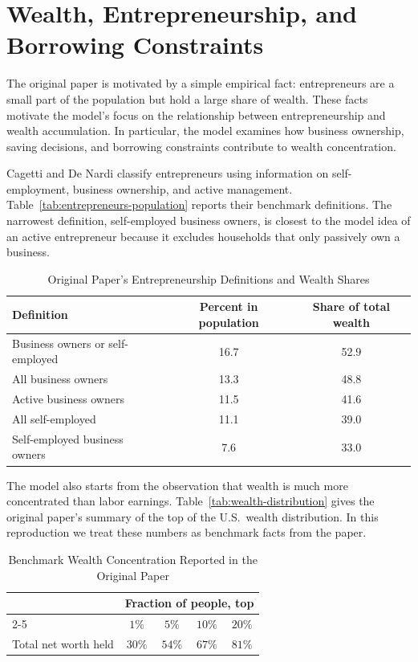 \documentclass[\latexroot/\projectname]{subfiles}
\begin{document}
\whenintegrated{\label{microeconomic-literature}}\par\section{Wealth, Entrepreneurship, and Borrowing Constraints}
\whenintegrated{\label{sec:microlit}}

The original paper is motivated by a simple empirical fact: entrepreneurs are a small part of the population but hold a large share of wealth. These facts motivate the model's focus on the relationship between entrepreneurship and wealth accumulation. In particular, the model examines how business ownership, saving decisions, and borrowing constraints contribute to wealth concentration.

Cagetti and De Nardi classify entrepreneurs using information on self-employment, business ownership, and active management. Table~\ref{tab:entrepreneurs-population} reports their benchmark definitions. The narrowest definition, self-employed business owners, is closest to the model idea of an active entrepreneur because it excludes households that only passively own a business.

\begin{table}[htbp]
  \centering
  \caption{Original Paper's Entrepreneurship Definitions and Wealth Shares}
  \whenintegrated{\label{tab:entrepreneurs-population}}
  \begin{tabular}{lcc}
    \hline\hline
    Definition & Percent in population & Share of total wealth \\
    \hline
    Business owners or self-employed & 16.7 & 52.9 \\
    All business owners & 13.3 & 48.8 \\
    Active business owners & 11.5 & 41.6 \\
    All self-employed & 11.1 & 39.0 \\
    Self-employed business owners & 7.6 & 33.0 \\
    \hline
  \end{tabular}
\end{table}

The model also starts from the observation that wealth is much more concentrated than labor earnings. Table~\ref{tab:wealth-distribution} gives the original paper's summary of the top of the U.S.\ wealth distribution. In this reproduction we treat these numbers as benchmark facts from the paper.

\begin{table}[htbp]
  \centering
  \caption{Benchmark Wealth Concentration Reported in the Original Paper}
  \whenintegrated{\label{tab:wealth-distribution}}
  \begin{tabular}{lcccc}
    \hline\hline
    & \multicolumn{4}{c}{Fraction of people, top} \\
    \cline{2-5}
    & $1\%$ & $5\%$ & $10\%$ & $20\%$ \\
    \hline
    Total net worth held & $30\%$ & $54\%$ & $67\%$ & $81\%$ \\
    \hline
  \end{tabular}
\end{table}
\end{document}
